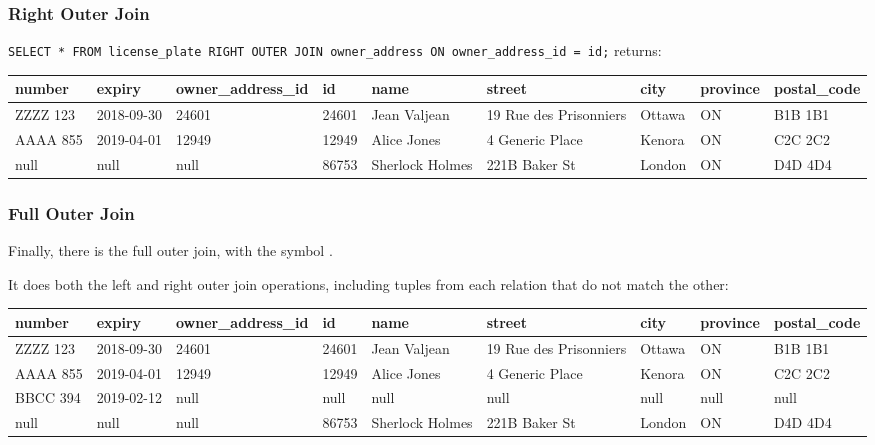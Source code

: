 \begin{frame}
\frametitle{Right Outer Join}


\texttt{SELECT * FROM license\_plate RIGHT OUTER JOIN owner\_address ON owner\_address\_id = id;} returns:

{\tiny
\begin{center}
	\begin{tabular}{|l|l|l|l|l|l|l|l|l|}\hline
		\textbf{number} & \textbf{expiry} & \textbf{owner\_address\_id} & \textbf{id} & \textbf{name} &\textbf{street} & \textbf{city} & \textbf{province} & \textbf{postal\_code} \\ \hline
		ZZZZ 123 & 2018-09-30 & 24601 & 24601 & Jean Valjean & 19 Rue des Prisonniers & Ottawa & ON & B1B 1B1\\ \hline
		AAAA 855 & 2019-04-01 & 12949 & 12949 & Alice Jones & 4 Generic Place & Kenora & ON & C2C 2C2\\ \hline
		null & null & null & 86753 & Sherlock Holmes & 221B Baker St & London & ON & D4D 4D4 \\ \hline
	\end{tabular}
\end{center}
}

\end{frame}



\begin{frame}
\frametitle{Full Outer Join}

Finally, there is the full outer join, with the symbol {\tiny {}}.

It does both the left and right outer join operations, including tuples from each relation that do not match the other: 

{\tiny
\begin{center}
	\begin{tabular}{|l|l|l|l|l|l|l|l|l|}\hline
		\textbf{number} & \textbf{expiry} & \textbf{owner\_address\_id} & \textbf{id} & \textbf{name} &\textbf{street} & \textbf{city} & \textbf{province} & \textbf{postal\_code} \\ \hline
		ZZZZ 123 & 2018-09-30 & 24601 & 24601 & Jean Valjean & 19 Rue des Prisonniers & Ottawa & ON & B1B 1B1\\ \hline
		AAAA 855 & 2019-04-01 & 12949 & 12949 & Alice Jones & 4 Generic Place & Kenora & ON & C2C 2C2\\ \hline
		BBCC 394 & 2019-02-12 & null & null & null & null & null & null & null \\ \hline
		null & null & null & 86753 & Sherlock Holmes & 221B Baker St & London & ON & D4D 4D4 \\ \hline
	\end{tabular}
\end{center}
}


\end{frame}







